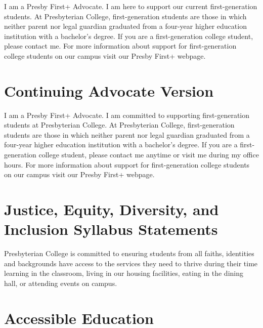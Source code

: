 \documentclass[
]{book}
\begin{document}
I am a Presby First+ Advocate. I am here to support our current first-generation students. At Presbyterian College, first-generation students are those in which neither parent nor legal guardian graduated from a four-year higher education institution with a bachelor's degree. If you are a first-generation college student, please contact me. For more information about support for first-generation college students on our campus visit our Presby First+ webpage.

\hypertarget{continuing-advocate-version}{%
\section*{Continuing Advocate Version}\label{continuing-advocate-version}}

I am a Presby First+ Advocate. I am committed to supporting first-generation students at Presbyterian College. At Presbyterian College, first-generation students are those in which neither parent nor legal guardian graduated from a four-year higher education institution with a bachelor's degree. If you are a first-generation college student, please contact me anytime or visit me during my office hours. For more information about support for first-generation college students on our campus visit our Presby First+ webpage.

\hypertarget{justice-equity-diversity-and-inclusion-syllabus-statements}{%
\section*{Justice, Equity, Diversity, and Inclusion Syllabus Statements}\label{justice-equity-diversity-and-inclusion-syllabus-statements}}

Presbyterian College is committed to ensuring students from all faiths, identities and backgrounds have access to the services they need to thrive during their time learning in the classroom, living in our housing facilities, eating in the dining hall, or attending events on campus.

\hypertarget{accessible-education}{%
\section*{Accessible Education}\label{accessible-education}}
\end{document}
